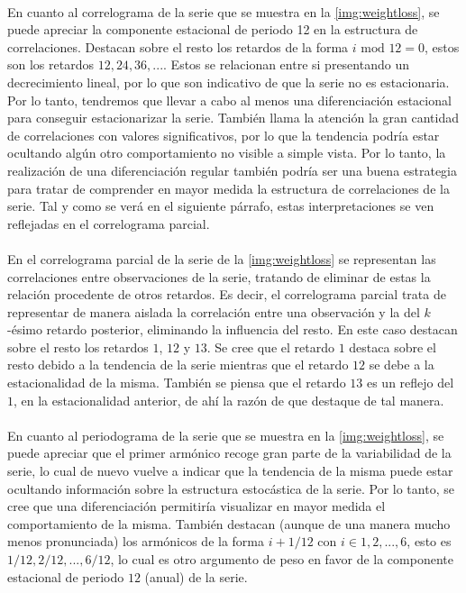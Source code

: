 \documentclass[a4paper, spanish]{article}
\begin{document}
      \paragraph{}
      En cuanto al correlograma de la serie que se muestra en la \autoref{img:weightloss}, se puede apreciar la componente estacional de periodo 12 en la estructura de correlaciones. Destacan sobre el resto los retardos de la forma $i \text{ mod } 12 = 0$, estos son los retardos $12, 24, 36,...$. Estos se relacionan entre si presentando un decrecimiento lineal, por lo que son indicativo de que la serie no es estacionaria. Por lo tanto, tendremos que llevar a cabo al menos una diferenciación estacional para conseguir estacionarizar la serie. También llama la atención la gran cantidad de correlaciones con valores significativos, por lo que la tendencia podría estar ocultando algún otro comportamiento no visible a simple vista. Por lo tanto, la realización de una diferenciación regular también podría ser una buena estrategia para tratar de comprender en mayor medida la estructura de correlaciones de la serie. Tal y como se verá en el siguiente párrafo, estas interpretaciones se ven reflejadas en el correlograma parcial.

      \paragraph{}
      En el correlograma parcial de la serie de la \autoref{img:weightloss} se representan las correlaciones entre observaciones de la serie, tratando de eliminar de estas la relación procedente de otros retardos. Es decir, el correlograma parcial trata de representar de manera aislada la correlación entre una observación y la del $k$-ésimo retardo posterior, eliminando la influencia del resto. En este caso destacan sobre el resto los retardos $1$, $12$ y $13$. Se cree que el retardo $1$ destaca sobre el resto debido a la tendencia de la serie mientras que el retardo $12$ se debe a la estacionalidad de la misma. También se piensa que el retardo $13$ es un reflejo del $1$, en la estacionalidad anterior, de ahí la razón de que destaque de tal manera.

      \paragraph{}
      En cuanto al periodograma de la serie que se muestra en la \autoref{img:weightloss}, se puede apreciar que el primer armónico recoge gran parte de la variabilidad de la serie, lo cual de nuevo vuelve a indicar que la tendencia de la misma puede estar ocultando información sobre la estructura estocástica de la serie. Por lo tanto, se cree que una diferenciación permitiría visualizar en mayor medida el comportamiento de la misma. También destacan (aunque de una manera mucho menos pronunciada) los armónicos de la forma $i + 1 / 12$ con $i \in {1, 2, ..., 6}$, esto es $1/12, 2/12, ..., 6/12$, lo cual es otro argumento de peso en favor de la componente estacional de periodo $12$ (anual) de la serie.
\end{document}
